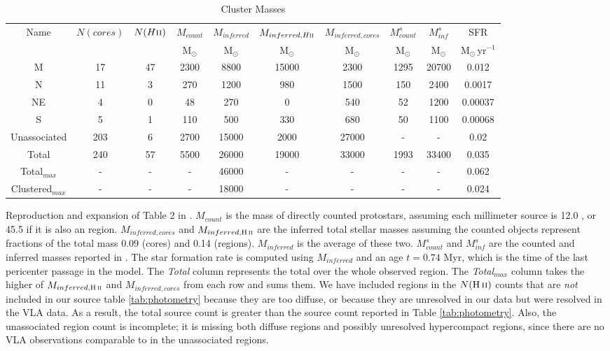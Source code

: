 \begin{table*}[htp]
\centering
\caption{Cluster Masses}
\begin{tabular}{cccccccccc}
\label{tab:clustermassestimates}
Name & $N(cores)$ & $N(H\textsc{ii})$ & $M_{count}$ & $M_{inferred}$ & $M_{inferred, H\textsc{ii}}$ & $M_{inferred, cores}$ & $M_{count}^s$ & $M_{inf}^s$ & SFR \\
 &  &  & $\mathrm{M_{\odot}}$ & $\mathrm{M_{\odot}}$ & $\mathrm{M_{\odot}}$ & $\mathrm{M_{\odot}}$ & $\mathrm{M_{\odot}}$ & $\mathrm{M_{\odot}}$ & $\mathrm{M_{\odot}\,yr^{-1}}$ \\
\hline
M & 17 & 47 & 2300 & 8800 & 15000 & 2300 & 1295 & 20700 & 0.012 \\
N & 11 & 3 & 270 & 1200 & 980 & 1500 & 150 & 2400 & 0.0017 \\
NE & 4 & 0 & 48 & 270 & 0 & 540 & 52 & 1200 & 0.00037 \\
S & 5 & 1 & 110 & 500 & 330 & 680 & 50 & 1100 & 0.00068 \\
Unassociated & 203 & 6 & 2700 & 15000 & 2000 & 27000 & - & - & 0.02 \\
Total & 240 & 57 & 5500 & 26000 & 19000 & 33000 & 1993 & 33400 & 0.035 \\
Total$_{max}$ & - & - & - & 46000 & - & - & - & - & 0.062 \\
Clustered$_{max}$ & - & - & - & 18000 & - & - & - & - & 0.024 \\
\hline
\end{tabular}
\par
Reproduction and expansion of Table 2 in \citet{Ginsburg2018a}. $M_{count}$ is the mass of directly counted protostars, assuming each millimeter source is 12.0 \msun, or 45.5 \msun if it is also an \hii region.  $M_{inferred,cores}$ and $M_{inferred,\hii}$ are the inferred total stellar masses assuming the counted objects represent fractions of the total mass 0.09 (cores) and 0.14 (\hii regions).  $M_{inferred}$ is the average of these two.  $M_{count}^s$ and $M_{inf}^s$ are the counted and inferred masses reported in \citet{Schmiedeke2016a}.  The star formation rate is computed using $M_{inferred}$ and an age $t=0.74$ Myr, which is the time of the last pericenter passage in the \citet{Kruijssen2015a} model.  The \emph{Total} column represents the total over the whole observed region.  The \emph{Total}$_{max}$ column takes the higher of $M_{inferred,\hii}$ and $M_{inferred,cores}$ from each row and sums them.  We have included \hii regions in the $N(\hii)$ counts  that are \emph{not} included in our source table \ref{tab:photometry} because they are too diffuse, or because they are unresolved in our data but were resolved in the \citet{De-Pree2014a} VLA data.  As a result, the total source count is greater than the source count reported in Table \ref{tab:photometry}. Also, the unassociated \hii region count is incomplete; it is missing both diffuse \hii regions and possibly unresolved hypercompact \hii regions, since there are no VLA observations comparable to \citet{De-Pree2014a} in the unassociated regions.
\end{table*}
